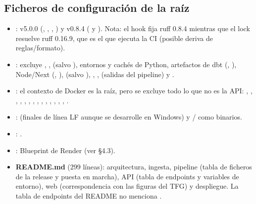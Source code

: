 \subsection{Ficheros de configuración de la raíz}

\begin{itemize}
\item \textbf{}:  v5.0.0 (, , , ) y  v0.8.4 ( y ). Nota: el hook fija ruff 0.8.4 mientras que el lock resuelve ruff 0.16.9, que es el que ejecuta la CI (posible deriva de reglas/formato).
\item \textbf{}: excluye , ,  (salvo ), entornos y cachés de Python, artefactos de dbt (, ), Node/Next (, ),  (salvo ), , ,  (salidas del pipeline) y .
\item \textbf{}: el contexto de Docker es la raíz, pero se excluye todo lo que no es la API: , , , , , , , , , , , , , , .
\item \textbf{}:  (finales de línea LF aunque se desarrolle en Windows) y / como binarios.
\item \textbf{}: .
\item \textbf{}: Blueprint de Render (ver §4.3).
\item \textbf{README.md} (299 líneas): arquitectura, ingesta, pipeline (tabla de ficheros de la release y puesta en marcha), API (tabla de endpoints y variables de entorno), web (correspondencia con las figuras del TFG) y despliegue. La tabla de endpoints del README no menciona .
\end{itemize}

